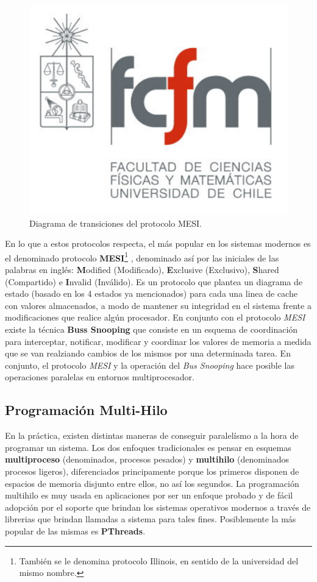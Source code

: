 \begin{figure}[!h]
	\centering
	\includegraphics[scale=0.3]{imagenes/fcfm}
	\caption{Diagrama de transiciones del protocolo MESI.}
	\label{fig:MESI}
\end{figure}

En lo que a estos protocolos respecta, el más popular en los sistemas modernos es el denominado protocolo \textbf{MESI}\footnote{También se le denomina protocolo Illinois, en sentido de la universidad del mismo nombre.} \cite{paper:MESI}, denominado así por las iniciales de las palabras en inglés: \textbf{M}odified (Modificado), \textbf{E}xclusive (Exclusivo), \textbf{S}hared (Compartido) e \textbf{I}nvalid (Inválido). Es un protocolo que plantea un diagrama de estado (basado en los 4 estados ya mencionados) para cada una linea de cache con valores almacenados, a modo de mantener su integridad en el sistema frente a modificaciones que realice algún procesador. En conjunto con el protocolo \emph{MESI} existe la técnica \textbf{Buss Snooping} \cite{paper:snoop} que consiste en un esquema de coordinación para interceptar, notificar, modificar y coordinar los valores de memoria a medida que se van realziando cambios de los mismos por una determinada tarea. En conjunto, el protocolo \emph{MESI} y la operación del \emph{Bus Snooping} hace posible las operaciones paralelas en entornos multiprocesador.

\subsection{Programación Multi-Hilo}
En la práctica, existen distintas maneras de conseguir paralelísmo a la hora de programar un sistema. Los dos enfoques tradicionales es pensar en esquemas \textbf{multiproceso} (denominados, procesos pesados) y \textbf{multihilo} (denominados procesos ligeros), diferenciados principamente porque los primeros disponen de espacios de memoria disjunto entre ellos, no así los segundos. La programación multihilo es muy usada en aplicaciones por ser un enfoque probado y de fácil adopción por el soporte que brindan los sistemas operativos modernos a través de librerias que brindan llamadas a sistema para tales fines. Posiblemente la más popular de las mismas es \textbf{PThreads}.

